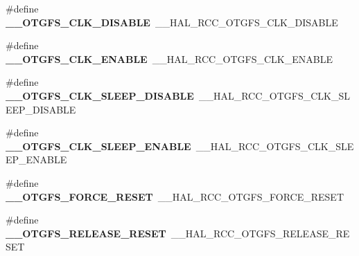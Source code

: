 \begin{DoxyCompactItemize}
\item 
\hypertarget{group___h_a_l___r_c_c___aliased_gae094c2bb538319468322f107da0e0928}{\#define {\bfseries \-\_\-\-\_\-\-O\-T\-G\-F\-S\-\_\-\-C\-L\-K\-\_\-\-D\-I\-S\-A\-B\-L\-E}~\-\_\-\-\_\-\-H\-A\-L\-\_\-\-R\-C\-C\-\_\-\-O\-T\-G\-F\-S\-\_\-\-C\-L\-K\-\_\-\-D\-I\-S\-A\-B\-L\-E}\label{group___h_a_l___r_c_c___aliased_gae094c2bb538319468322f107da0e0928}

\item 
\hypertarget{group___h_a_l___r_c_c___aliased_ga3703949f8a2d819cb3097098883a5922}{\#define {\bfseries \-\_\-\-\_\-\-O\-T\-G\-F\-S\-\_\-\-C\-L\-K\-\_\-\-E\-N\-A\-B\-L\-E}~\-\_\-\-\_\-\-H\-A\-L\-\_\-\-R\-C\-C\-\_\-\-O\-T\-G\-F\-S\-\_\-\-C\-L\-K\-\_\-\-E\-N\-A\-B\-L\-E}\label{group___h_a_l___r_c_c___aliased_ga3703949f8a2d819cb3097098883a5922}

\item 
\hypertarget{group___h_a_l___r_c_c___aliased_ga8a660adfdaf43449bcaa7febee65c64b}{\#define {\bfseries \-\_\-\-\_\-\-O\-T\-G\-F\-S\-\_\-\-C\-L\-K\-\_\-\-S\-L\-E\-E\-P\-\_\-\-D\-I\-S\-A\-B\-L\-E}~\-\_\-\-\_\-\-H\-A\-L\-\_\-\-R\-C\-C\-\_\-\-O\-T\-G\-F\-S\-\_\-\-C\-L\-K\-\_\-\-S\-L\-E\-E\-P\-\_\-\-D\-I\-S\-A\-B\-L\-E}\label{group___h_a_l___r_c_c___aliased_ga8a660adfdaf43449bcaa7febee65c64b}

\item 
\hypertarget{group___h_a_l___r_c_c___aliased_ga8f38b03c4194f0f482144aadcb00ab8f}{\#define {\bfseries \-\_\-\-\_\-\-O\-T\-G\-F\-S\-\_\-\-C\-L\-K\-\_\-\-S\-L\-E\-E\-P\-\_\-\-E\-N\-A\-B\-L\-E}~\-\_\-\-\_\-\-H\-A\-L\-\_\-\-R\-C\-C\-\_\-\-O\-T\-G\-F\-S\-\_\-\-C\-L\-K\-\_\-\-S\-L\-E\-E\-P\-\_\-\-E\-N\-A\-B\-L\-E}\label{group___h_a_l___r_c_c___aliased_ga8f38b03c4194f0f482144aadcb00ab8f}

\item 
\hypertarget{group___h_a_l___r_c_c___aliased_ga594ca5912c4170fab0422fb9063e3ced}{\#define {\bfseries \-\_\-\-\_\-\-O\-T\-G\-F\-S\-\_\-\-F\-O\-R\-C\-E\-\_\-\-R\-E\-S\-E\-T}~\-\_\-\-\_\-\-H\-A\-L\-\_\-\-R\-C\-C\-\_\-\-O\-T\-G\-F\-S\-\_\-\-F\-O\-R\-C\-E\-\_\-\-R\-E\-S\-E\-T}\label{group___h_a_l___r_c_c___aliased_ga594ca5912c4170fab0422fb9063e3ced}

\item 
\hypertarget{group___h_a_l___r_c_c___aliased_gafe14baff640d24ba82665e9b513beb8f}{\#define {\bfseries \-\_\-\-\_\-\-O\-T\-G\-F\-S\-\_\-\-R\-E\-L\-E\-A\-S\-E\-\_\-\-R\-E\-S\-E\-T}~\-\_\-\-\_\-\-H\-A\-L\-\_\-\-R\-C\-C\-\_\-\-O\-T\-G\-F\-S\-\_\-\-R\-E\-L\-E\-A\-S\-E\-\_\-\-R\-E\-S\-E\-T}\label{group___h_a_l___r_c_c___aliased_gafe14baff640d24ba82665e9b513beb8f}


\end{DoxyCompactItemize}
